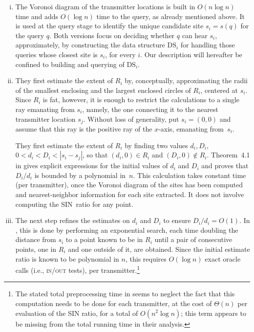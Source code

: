 \documentclass[11pt]{article}
\theoremstyle{remark}
\begin{document}
\begin{enumerate}[(i)]
\item The Voronoi diagram of the transmitter locations is built in $O(n \log n)$ time and adds $O(\log n)$ time to the query, as already mentioned above.
It is used at the query stage to identify the unique candidate site $s_i=s(q)$ for the query $q$.  Both versions focus on deciding whether $q$ can hear $s_i$, approximately, by constructing the data structure $\mbox{DS}_i$ for handling those queries whose closest site is $s_i$, for every $i$.  Our description will  hereafter be confined to building and querying of $\mbox{DS}_i$.


\item They first estimate the extent of $R_i$ by, conceptually, approximating the radii of the smallest enclosing and the largest enclosed circles of $R_i$, centered at $s_i$.  Since $R_i$ is fat, however, it is enough to restrict the calculations to a single ray emanating from $s_i$, namely, the one connecting it to the nearest transmitter location $s_j$.  Without loss of generality, put $s_i=(0,0)$ and assume that this ray is the positive ray of the $x$-axis, emanating from~$s_i$.  

They first estimate the extent of $R_i$ by finding two values $d_i, D_i$, $0 < d_i < D_i < |s_i-s_j|$, so that $(d_i,0) \in R_i$ and $(D_i,0) \not\in R_i$.  Theorem~4.1 in \cite{aeklpr-sdciawn-12} gives explicit expressions for the initial values of $d_i$ and $D_i$ and proves that $D_i/d_i$ is bounded by a polynomial in~$n$.  This calculation takes constant time (per transmitter), once the Voronoi diagram of the sites has been computed and nearest-neighbor information for each site extracted.  It does not involve computing the SIN~ratio for any point.

\item The next step refines the estimates on $d_i$ and $D_i$ to ensure $D_i/d_i=O(1)$.
In \cite{aeklpr-sdciawn-12}, this is done  by performing an exponential search, each time doubling the distance from $s_i$ to a point known to be in $R_i$ until a pair of consecutive points, one in $R_i$ and one outside of it, are obtained.  Since the initial estimate ratio is known to be polynomial in $n$, this requires $O(\log n)$ exact oracle calls (i.e., \textsc{in/out} tests), per transmitter.\footnote{The stated total preprocessing time in \cite{aeklpr-sdciawn-12} seems to neglect the fact that this computation needs to be done for each transmitter, at the cost of $\Theta(n)$ per evaluation of the SIN ratio, for a total of $O(n^2 \log n)$; this term appears to be missing from the total running time in their analysis.}




\end{enumerate}
\end{document}

